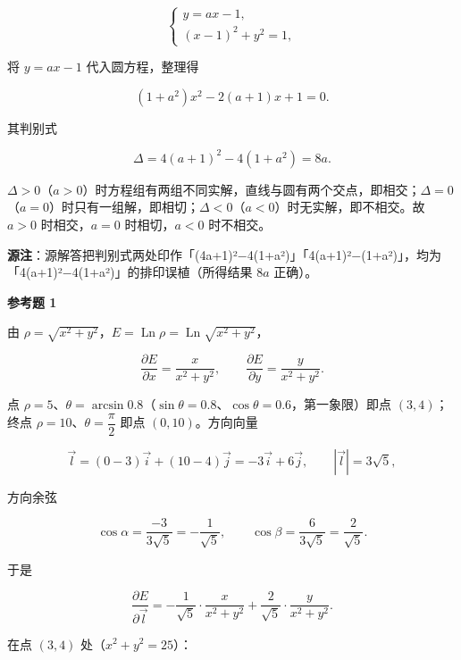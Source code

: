 \begin{answer}
\nopagebreak[4]
\[
\begin{cases}
y=ax-1,\\
(x-1)^{2}+y^{2}=1,
\end{cases}
\]

将 $y=ax-1$ 代入圆方程，整理得

\nopagebreak[4]
\[
(1+a^{2})x^{2}-2(a+1)x+1=0.
\]

其判别式

\nopagebreak[4]
\[
\Delta=4(a+1)^{2}-4(1+a^{2})=8a.
\]

$\Delta>0$（$a>0$）时方程组有两组不同实解，直线与圆有两个交点，即相交；$\Delta=0$（$a=0$）时只有一组解，即相切；$\Delta<0$（$a<0$）时无实解，即不相交。故 $a>0$ 时相交，$a=0$ 时相切，$a<0$ 时不相交。

\begin{gktip}
\textbf{源注}：源解答把判别式两处印作「(4a+1)²$-$4(1+a²)」「4(a+1)²$-$(1+a²)」，均为「4(a+1)²$-$4(1+a²)」的排印误植（所得结果 $8a$ 正确）。
\end{gktip}

\textbf{参考题 1}
\nopagebreak[4]
\begin{center}\end{center}
\nopagebreak[4]
由 $\rho=\sqrt{x^{2}+y^{2}}$，$E=\operatorname{Ln}\rho=\operatorname{Ln}\sqrt{x^{2}+y^{2}}$，

\nopagebreak[4]
\[
\frac{\partial E}{\partial x}=\frac{x}{x^{2}+y^{2}},
\qquad
\frac{\partial E}{\partial y}=\frac{y}{x^{2}+y^{2}}.
\]

点 $\rho=5$、$\theta=\arcsin 0.8$（$\sin\theta=0.8$、$\cos\theta=0.6$，第一象限）即点 $(3,4)$；终点 $\rho=10$、$\theta=\dfrac{\pi}{2}$ 即点 $(0,10)$。方向向量

\nopagebreak[4]
\[
\vec{l}=(0-3)\vec{i}+(10-4)\vec{j}=-3\vec{i}+6\vec{j},
\qquad
\left|\vec{l}\right|=3\sqrt{5},
\]

方向余弦

\nopagebreak[4]
\[
\cos\alpha=\frac{-3}{3\sqrt{5}}=-\frac{1}{\sqrt{5}},
\qquad
\cos\beta=\frac{6}{3\sqrt{5}}=\frac{2}{\sqrt{5}}.
\]

于是

\nopagebreak[4]
\[
\frac{\partial E}{\partial\vec{l}}
=-\frac{1}{\sqrt{5}}\cdot\frac{x}{x^{2}+y^{2}}
+\frac{2}{\sqrt{5}}\cdot\frac{y}{x^{2}+y^{2}}.
\]

在点 $(3,4)$ 处（$x^{2}+y^{2}=25$）：


\end{answer}
